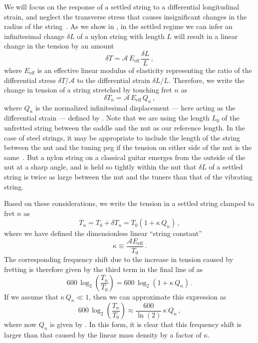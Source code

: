We will focus on the response of a settled string to a differential longitudinal strain, and neglect the transverse stress that causes insignificant changes in the radius of the string~\cite{ref:lynchaird2017mpn}. As we show in , in the settled regime we can infer an infinitesimal change $\delta L$ of a nylon string with length $L$ will result in a linear change in the tension by an amount~\cite{ref:landau1986toe}
\begin{equation} \label{eqn:youngs_mod_def}
  \delta T = \mathcal{A}\, E_\mathrm{eff}\, \frac{\delta L}{L}\, ,
\end{equation}
where $E_\mathrm{eff}$ is an effective linear modulus of elasticity representing the ratio of the differential stress $\delta T / \mathcal{A}$ to the differential strain $\delta L / L$. Therefore, we write the change in tension of a string stretched by touching fret $n$ as
 \begin{equation} \label{eqn:delta_t_n}
\delta T_n = \mathcal{A}\, E_\mathrm{eff}\, Q_n\, ,
 \end{equation}
where $Q_n$ is the normalized infinitesimal displacement --- here acting as the differential strain --- defined by . Note that we are using the length $L_0$ of the unfretted string between the saddle and the nut as our reference length. In the case of steel strings, it may be appropriate to include the length of the string between the nut and the tuning peg if the tension on either side of the nut is the same~\cite{ref:kemp2020ibg}. But a nylon string on a classical guitar emerges from the outside of the nut at a sharp angle, and is held so tightly within the nut that $\delta L$ of a settled string is twice as large between the nut and the tuners than that of the vibrating string.

Based on these considerations, we write the tension in a settled string clamped to fret $n$ as
 \begin{equation} \label{eqn:t_n_def}
T_n = T_0 + \delta T_n = T_0 \left( 1 + \kappa\, Q_n \right)\, ,
 \end{equation}
where we have defined the dimensionless linear ``string constant''
 \begin{equation}\label{eqn:kappa_def}
\kappa \equiv \frac{\mathcal{A} E_\mathrm{eff}}{T_0}\, .
 \end{equation}
The corresponding frequency shift due to the increase in tension caused by fretting is therefore given by the third term in the final line of  as
\begin{equation} \label{eqn:tension_shift}
  600\, \log_2 \left(  \frac{T_n}{T_0} \right) = 600\, \log_2 \left( 1 + \kappa\, Q_n \right)\, .
\end{equation}
If we assume that $\kappa\, Q_n \ll 1$, then we can approximate  this expression as
\begin{equation} \label{eqn:tension_approx}
  600\, \log_2 \left(  \frac{T_n}{T_0} \right) \approx \frac{600}{\ln(2)}\, \kappa\, Q_n\, ,
\end{equation}
where now $Q_n$ is given by . In this form, it is clear that this frequency shift is larger than that caused by the linear mass density by a factor of $\kappa$.

